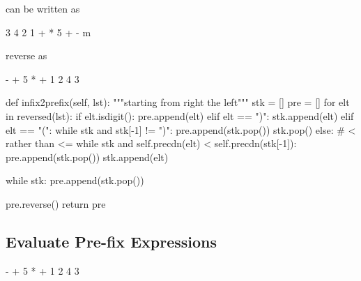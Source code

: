 can be written as
\begin{python}
3 4 2 1 + * 5 + - m
\end{python}

reverse as 
\begin{python}
- + 5 * + 1 2 4 3
\end{python}

\begin{python}
  def infix2prefix(self, lst):
    """starting from right the left"""
    stk = []
    pre = []
    for elt in reversed(lst):
      if elt.isdigit():
        pre.append(elt)
      elif elt == ")":
        stk.append(elt)
      elif elt == "(":
        while stk and stk[-1] != ")":
          pre.append(stk.pop())
        stk.pop()
      else:
        # < rather than <=
        while stk and self.precdn(elt) < self.precdn(stk[-1]):  
          pre.append(stk.pop())
        stk.append(elt)

    while stk:
      pre.append(stk.pop())

    pre.reverse()
    return pre
\end{python}


\subsection{Evaluate Pre-fix Expressions}
\begin{python}
- + 5 * + 1 2 4 3
\end{python}
